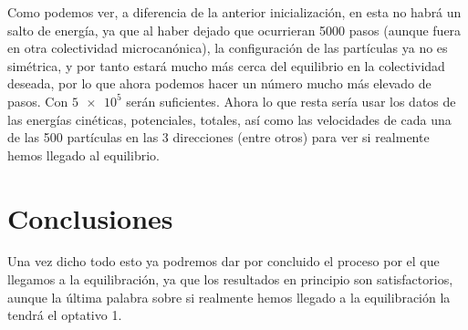 \documentclass[11pt]{article} %
\begin{document}
Como podemos ver, a diferencia de la anterior inicialización, en esta no habrá un salto de energía, ya que al haber dejado que ocurrieran 5000 pasos (aunque fuera en otra colectividad microcanónica), la configuración de las partículas ya no es simétrica, y por tanto estará mucho más cerca del equilibrio en la colectividad deseada, por lo que ahora podemos hacer un número mucho más elevado de pasos. Con $\num{5e5}$ serán suficientes. Ahora lo que resta sería usar los datos de las energías cinéticas, potenciales, totales, así como las velocidades de cada una de las 500 partículas en las 3 direcciones (entre otros) para ver si realmente hemos llegado al equilibrio.  


\section{Conclusiones}

Una vez dicho todo esto ya podremos dar por concluido el proceso por el que llegamos a la equilibración, ya que los resultados en principio son satisfactorios, aunque la última palabra sobre si realmente hemos llegado a la equilibración la tendrá el optativo 1. 




	
\end{document}
